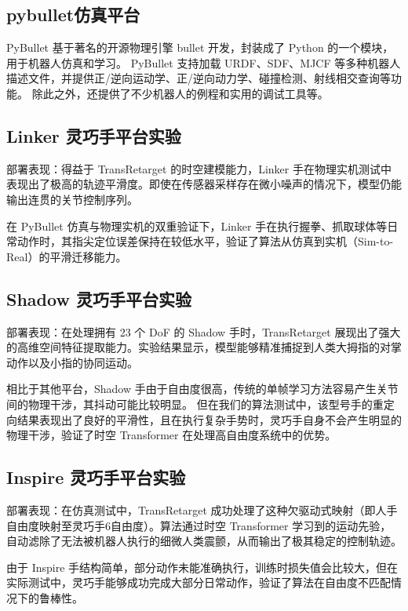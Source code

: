 \subsection{pybullet仿真平台}
PyBullet 基于著名的开源物理引擎 bullet 开发，封装成了 Python 的一个模块，用于机器人仿真和学习。
PyBullet 支持加载 URDF、SDF、MJCF 等多种机器人描述文件，并提供正/逆向运动学、正/逆向动力学、碰撞检测、射线相交查询等功能。
除此之外，还提供了不少机器人的例程和实用的调试工具等。
\subsection{Linker 灵巧手平台实验}
部署表现：得益于 TransRetarget 的时空建模能力，Linker 手在物理实机测试中表现出了极高的轨迹平滑度。即使在传感器采样存在微小噪声的情况下，模型仍能输出连贯的关节控制序列。

在 PyBullet 仿真与物理实机的双重验证下，Linker 手在执行握拳、抓取球体等日常动作时，其指尖定位误差保持在较低水平，验证了算法从仿真到实机（Sim-to-Real）的平滑迁移能力。

\subsection{Shadow 灵巧手平台实验}

部署表现：在处理拥有 23 个 DoF 的 Shadow 手时，TransRetarget 展现出了强大的高维空间特征提取能力。实验结果显示，模型能够精准捕捉到人类大拇指的对掌动作以及小指的协同运动。

相比于其他平台，Shadow 手由于自由度很高，传统的单帧学习方法容易产生关节间的物理干涉，其抖动可能比较明显。
但在我们的算法测试中，该型号手的重定向结果表现出了良好的平滑性，且在执行复杂手势时，灵巧手自身不会产生明显的物理干涉，验证了时空 Transformer 在处理高自由度系统中的优势。
\subsection{Inspire 灵巧手平台实验}

部署表现：在仿真测试中，TransRetarget 成功处理了这种欠驱动式映射（即人手自由度映射至灵巧手6自由度）。算法通过时空 Transformer 学习到的运动先验，自动滤除了无法被机器人执行的细微人类震颤，从而输出了极其稳定的控制轨迹。

由于 Inspire 手结构简单，部分动作未能准确执行，训练时损失值会比较大，但在实际测试中，灵巧手能够成功完成大部分日常动作，验证了算法在自由度不匹配情况下的鲁棒性。

